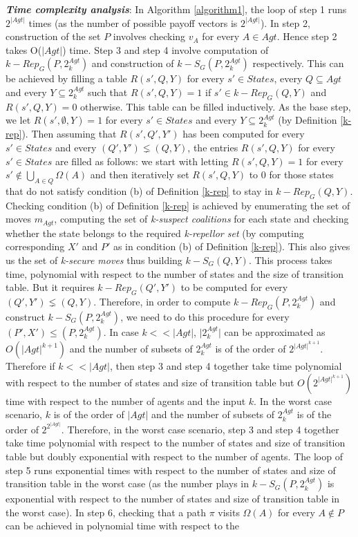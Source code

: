 \textit{\textbf{Time complexity analysis}}: In Algorithm \ref{algorithm1}, the loop of step 1 runs $2^{\vert Agt \vert}$ times (as the number of possible payoff vectors is $2^{\vert Agt \vert}$). In step 2, construction of the set $P$ involves checking $v_{A}$ for every $A \in Agt$. Hence step 2 takes O($\vert Agt \vert$) time. Step 3 and step 4 involve computation of $k-Rep_{G}(P, 2^{Agt}_{k})$ and construction of $k-S_{G}(P, 2^{Agt}_{k})$ respectively. This can be achieved by filling a table $R(s', Q, Y)$ for every $s' \in States$, every $Q \subseteq Agt$ and every $Y \subseteq 2^{Agt}_{k}$ such that $R(s', Q, Y) = 1$ if $s' \in k-Rep_{G}(Q, Y)$ and $R(s', Q, Y) = 0$ otherwise. This table can be filled inductively. As the base step, we let $R(s', \emptyset, Y) = 1$ for every $s' \in States$ and every $Y \subseteq 2^{Agt}_{k}$ (by Definition \ref{k-rep}). Then assuming that $R(s', Q', Y')$ has been computed for every $s' \in States$ and every $(Q', Y') \lneq (Q, Y)$, the entries $R(s', Q, Y)$ for every $s' \in States$ are filled as follows: we start with letting $R(s', Q, Y) = 1$ for every $s' \notin \bigcup \limits_{A \in Q}\Omega(A)$ and then iteratively set $R(s', Q, Y)$ to $0$ for those states that do not satisfy condition (b) of Definition \ref{k-rep} to stay in $k-Rep_{G}(Q, Y)$. Checking condition (b) of Definition \ref{k-rep} is achieved by enumerating the set of moves $m_{Agt}$, computing the set of \textit{k-suspect coalitions} for each state and checking whether the state belongs to the required \textit{k-repellor set} (by computing corresponding $X'$ and $P'$ as in condition (b) of Definition \ref{k-rep}). This also gives us the set of \textit{k-secure moves} thus building $k-S_{G}(Q, Y)$. This process takes time, polynomial with respect to the number of states and the size of transition table. But it requires $k-Rep_{G}(Q', Y')$ to be computed for every $(Q', Y') \lneq (Q, Y)$. Therefore, in order to compute $k-Rep_{G}(P, 2^{Agt}_{k})$ and construct $k-S_{G}(P, 2^{Agt}_{k})$, we need to do this procedure for every $(P', X') \leq (P, 2^{Agt}_{k})$. In case $k << \vert Agt \vert$, $\vert 2^{Agt}_{k} \vert$ can be approximated as $O(\vert Agt \vert^{k+1})$ and the number of subsets of $2^{Agt}_{k}$ is of the order of $2^{\vert Agt \vert^{k+1}}$. Therefore if $k << \vert Agt \vert$, then step 3 and step 4 together take time polynomial with respect to the number of states and size of transition table but $O(2^{\vert Agt \vert^{k+1}})$ time with respect to the number of agents and the input $k$. In the worst case scenario, $k$ is of the order of $\vert Agt \vert$ and the number of subsets of $2^{Agt}_{k}$ is of the order of $2^{2^{\vert Agt \vert}}$. Therefore, in the worst case scenario, step 3 and step 4 together take time polynomial with respect to the number of states and size of transition table but doubly exponential with respect to the number of agents. The loop of step 5 runs exponential times with respect to the number of states and size of transition table in the worst case (as the number plays in $k-S_{G}(P, 2^{Agt}_{k})$ is exponential with respect to the number of states and size of transition table in the worst case). In step 6, checking that a path $\pi$ visits $\Omega(A)$ for every $A \notin P$ can be achieved in polynomial time with respect to the 